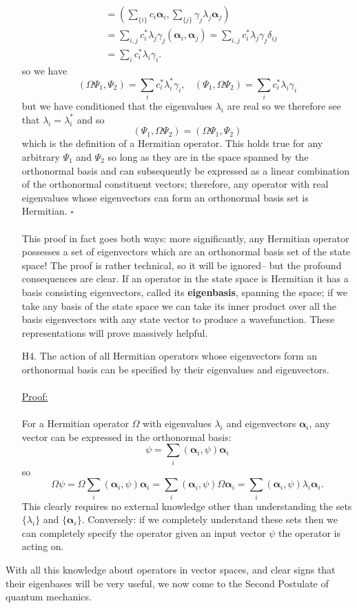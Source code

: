 \begin{enumerate}
$$\begin{aligned}
    &= \left(\sum_{\{i\}}c_{i}\bm{\alpha}_{i},\sum_{\{j\}}\gamma_{j}\lambda_{j}\bm{\alpha}_{j}\right)\\
    &=\sum_{i,j}c_{i}^{\ast}\lambda_{j}\gamma_{j}(\bm{\alpha}_{i},\bm{\alpha}_{j})=\sum_{i,j}c_{i}^{\ast}\lambda_{j}\gamma_{j}\delta_{ij}\\
    &=\sum_{i}c_{i}^{\ast}\lambda_{i}\gamma_{i}.
    \end{aligned}
    $$
    so we have 
    $$
    (\Omega\Psi_{1},\Psi_{2})=\sum_{i}c^{\ast}_{i}\lambda^{\ast}_{i}\gamma_{i},\:\:\:\:(\Psi_{1},\Omega\Psi_{2})=\sum_{i}c_{i}^{\ast}\lambda_{i}\gamma_{i}
    $$
    but we have conditioned that the eigenvalues $\lambda_{i}$ are real so we therefore see that $\lambda_{i}=\lambda_{i}^{\ast}$ and so
    $$
    (\Psi_{1},\Omega\Psi_{2})=(\Omega\Psi_{1},\Psi_{2})
    $$
    which is the definition of a Hermitian operator. This holds true for any arbitrary $\Psi_{1}$ and $\Psi_{2}$ so long as they are in the space spanned by the orthonormal basis and can subsequently be expressed as a linear combination of the orthonormal constituent vectors; therefore, any operator with real eigenvalues whose eigenvectors can form an orthonormal basis set is Hermitian. $\square$
    \\\\
    This proof in fact goes both ways: more significantly, any Hermitian operator possesses a set of eigenvectors which are an orthonormal basis set of the state space! The proof is rather technical,
    so it will be ignored-- but the profound consequences are clear. If an operator in the state space is Hermitian it has a basis consisting eigenvectors, called its \textbf{eigenbasis}, spanning the space; if we take any basis of the state space we can take its inner product over all the basis eigenvectors with any state vector to produce a wavefunction. These representations will prove massively helpful.
    \item[H4.] The action of all Hermitian operators whose eigenvectors form an orthonormal basis can be specified by their eigenvalues and eigenvectors.\\\\
    \underline{Proof:}\\\\
    For a Hermitian operator $\Omega$ with eigenvalues $\lambda_{i}$ and eigenvectors $\bm{\alpha}_{i}$, any vector can be expressed in the orthonormal basis:
    $$
    \psi=\sum_{i}(\bm{\alpha}_{i},\psi)\bm{\alpha}_{i}
    $$
    so 
    $$
    \Omega\psi=\Omega\sum_{i}(\bm{\alpha}_{i},\psi)\bm{\alpha}_{i}=\sum_{i}(\bm{\alpha}_{i},\psi)\Omega\bm{\alpha}_{i}=\sum_{i}(\bm{\alpha}_{i},\psi)\lambda_{i}\bm{\alpha}_{i}.
    $$
    This clearly requires no external knowledge other than understanding the sets $\{\lambda_{i}\}$ and $\{\bm{\alpha}_{i}\}$. Conversely: if we completely understand these sets then we can completely specify the operator given an input vector $\psi$ the operator is acting on. 
\end{enumerate}
With all this knowledge about operators in vector spaces, and clear signs that their eigenbases will be very useful, we now come to the Second Postulate of quantum mechanics.

